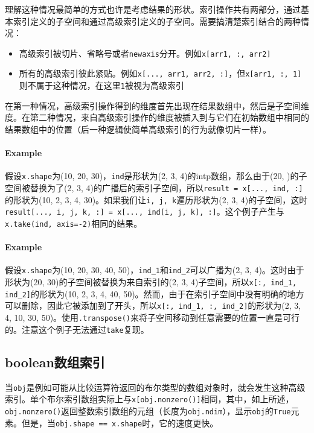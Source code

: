 \documentclass[../main.tex]{subfile}
\begin{document}
理解这种情况最简单的方式也许是考虑结果的形状。索引操作共有两部分，通过基本索引定义的子空间和通过高级索引定义的子空间。需要搞清楚索引结合的两种情况：
\begin{itemize}
    \item 高级索引被切片、省略号或者\lstinline{newaxis}分开。例如\lstinline{x[arr1, :, arr2]}
    \item 所有的高级索引彼此紧贴。例如\lstinline{x[..., arr1, arr2, :]}，但\lstinline{x[arr1, :, 1]}则不属于这种情况，在这里\lstinline{1}被视为高级索引
\end{itemize}

在第一种情况，高级索引操作得到的维度首先出现在结果数组中，然后是子空间维度。在第二种情况，来自高级索引操作的维度被插入到与它们在初始数组中相同的结果数组中的位置（后一种逻辑使简单高级索引的行为就像切片一样）。

\paragraph{Example}假设\lstinline{x.shape}为(10, 20, 30)，\lstinline{ind}是形状为(2, 3, 4)的intp数组，那么由于(20, )的子空间被替换为了(2, 3, 4)的广播后的索引子空间，所以\lstinline{result = x[..., ind, :]}的形状为(10, 2, 3, 4, 30)。如果我们让\lstinline{i, j, k}遍历形状为(2, 3, 4)的子空间，这时\lstinline{result[..., i, j, k, :] = x[..., ind[i, j, k], :]}。这个例子产生与\lstinline{x.take(ind, axis=-2)}相同的结果。

\paragraph{Example}假设\lstinline{x.shape}为(10, 20, 30, 40, 50)，\lstinline{ind_1}和\lstinline{ind_2}可以广播为(2, 3, 4)。这时由于形状为(20, 30)的子空间被替换为来自索引的(2, 3, 4)子空间，所以\lstinline{x[:, ind_1, ind_2]}的形状为(10, 2, 3, 4, 40, 50)。然而，由于在索引子空间中没有明确的地方可以删除，因此它被添加到了开头，所以\lstinline{x[:, ind_1, :, ind_2]}的形状为(2, 3, 4, 10, 30, 50)。使用\lstinline{.transpose()}来将子空间移动到任意需要的位置一直是可行的。注意这个例子无法通过\lstinline{take}复现。

\subsection{boolean数组索引}

当\lstinline{obj}是例如可能从比较运算符返回的布尔类型的数组对象时，就会发生这种高级索引。单个布尔索引数组实际上与\lstinline{x[obj.nonzero()]}相同，其中，如上所述，\lstinline{obj.nonzero()}返回整数索引数组的元组（长度为\lstinline{obj.ndim}），显示\lstinline{obj}的\lstinline{True}元素。但是，当\lstinline{obj.shape == x.shape}时，它的速度更快。
\end{document}
